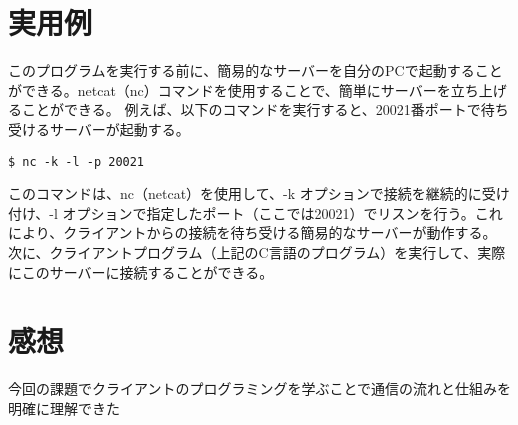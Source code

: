 \documentclass{jlreq}
\begin{document}
\section{実用例}
このプログラムを実行する前に、簡易的なサーバーを自分のPCで起動することができる。netcat（nc）コマンドを使用することで、簡単にサーバーを立ち上げることができる。
例えば、以下のコマンドを実行すると、20021番ポートで待ち受けるサーバーが起動する。
\begin{lstlisting}[caption=switch,label=fuga]
$ nc -k -l -p 20021
\end{lstlisting}
このコマンドは、nc（netcat）を使用して、-k オプションで接続を継続的に受け付け、-l オプションで指定したポート（ここでは20021）でリスンを行う。これにより、クライアントからの接続を待ち受ける簡易的なサーバーが動作する。
次に、クライアントプログラム（上記のC言語のプログラム）を実行して、実際にこのサーバーに接続することができる。

\section{感想}
今回の課題でクライアントのプログラミングを学ぶことで通信の流れと仕組みを明確に理解できた
\end{document}
